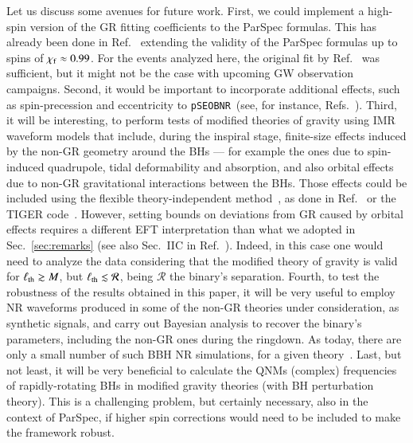 \documentclass[twocolumn,
               prd,
               aps,
               superscriptaddress,
               tightenlines,
               nofootinbib,
               eqsecnum,
               amsfonts,
               amsmath,
               longbibliography]{revtex4-1}
\newcommand{\pSEOB}{\texttt{pSEOBNR}}
\begin{document}
Let us discuss some avenues for future work.
%
First, we could implement a high-spin version of the GR fitting coefficients to the ParSpec formulas.
%
This has already been done in Ref.~\cite{Carullo:2021dui} extending the validity of the ParSpec formulas up to
spins of $\chi_{\rm f} \approx 0.99$.
%
For the events analyzed here, the original fit by Ref.~\cite{Maselli:2019mjd}
was sufficient, but it might not be the case with upcoming GW observation campaigns.
%
Second, it would be important to incorporate additional effects, such as spin-precession and eccentricity
to \pSEOB~(see, for instance, Refs.~\cite{Ossokine:2020kjp,Ramos-Buades:2021adz}).
%
Third, it will be
interesting, to perform tests of modified theories of gravity using IMR waveform models that include, during
the inspiral stage, finite-size effects induced by the non-GR geometry around the BHs ---
for example the ones due to spin-induced quadrupole, tidal deformability and absorption, and also
orbital effects due to non-GR gravitational interactions
between the BHs. Those effects could be included using the flexible theory-independent
method~\cite{Mehta:2022pcn}, as done in Ref.~\cite{Sennett:2019bpc} or the
TIGER code~\cite{Li:2011cg,Agathos:2013upa}. However, setting bounds on deviations
from GR caused by orbital effects requires a different EFT interpretation than what we
adopted in Sec.~\ref{sec:remarks} (see also Sec.~IIC in Ref.~\cite{Sennett:2019bpc}).
Indeed, in this case one would need to analyze the data considering that the modified theory of
gravity is valid for $\ell_{\rm th} \gtrsim  M$, but $\ell_{\rm th} \lesssim \mathcal{R}$, being $\mathcal{R}$ the binary's separation.
%
Fourth, to test the robustness of the results obtained in this paper, it will be very useful to employ NR waveforms
produced in some of the non-GR theories under consideration, as synthetic signals, and carry out
Bayesian analysis to recover the binary's parameters, including the non-GR ones during the ringdown.
As today, there are only a small number of such BBH NR simulations, for a
given theory~\cite{Healy:2011ef,Witek:2018dmd,Okounkova:2017yby,Hirschmann:2017psw,Okounkova:2020rqw,Okounkova:2020rqw,Silva:2020omi,East:2020hgw,East:2021bqk,Figueras:2021abd}.
%
Last, but not least, it will be very
beneficial to calculate the QNMs (complex) frequencies of rapidly-rotating BHs in modified gravity theories
(with BH perturbation theory). This is a challenging problem, but certainly necessary,
also in the context of ParSpec, if higher spin corrections would need to be
included to make the framework robust.
\end{document}
